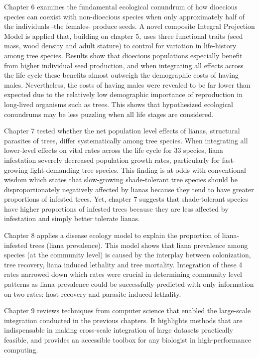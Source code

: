 \documentclass[b5paper,justified]{tufte-book} %
\begin{document}
\begin{fullwidth}
Chapter 6 examines the fundamental ecological conundrum of how dioecious species can coexist with non-dioecious species when only approximately half of the individuals -the females- produce seeds. A novel composite Integral Projection Model is applied that, building on chapter 5, uses three functional traits (seed mass, wood density and adult stature) to control for variation in life-history among tree species. Results show that dioecious populations especially benefit from higher individual seed production, and when integrating all effects across the life cycle these benefits almost outweigh the demographic costs of having males. Nevertheless, the costs of having males were revealed to be far lower than expected due to the relatively low demographic importance of reproduction in long-lived organisms such as trees. This shows that hypothesized ecological conundrums may be less puzzling when all life stages are considered. 

Chapter 7 tested whether the net population level effects of lianas, structural parasites of trees, differ systematically among tree species. When integrating all lower-level effects on vital rates across the life cycle for 33 species, liana infestation severely decreased population growth rates, particularly for fast-growing light-demanding tree species. This finding is at odds with conventional wisdom which states that slow-growing shade-tolerant tree species should be disproportionately negatively affected by lianas because they tend to have greater proportions of infested trees.  Yet, chapter 7 suggests that shade-tolerant species have higher proportions of infested trees because they are less affected by infestation and simply better tolerate lianas. 

Chapter 8 applies a disease ecology model to explain the proportion of liana-infested trees (liana prevalence). This model shows that liana prevalence among species (at the community level) is caused by the interplay between colonization, tree recovery, liana induced lethality and tree mortality. Integration of these 4 rates narrowed down which rates were crucial in determining community level patterns as liana prevalence could be successfully predicted with only information on two rates: host recovery and parasite induced lethality. 

Chapter 9 reviews techniques from computer science that enabled the large-scale integration conducted in the previous chapters. It highlights methods that are indispensable in making cross-scale integration of large datasets practically feasible, and provides an accessible toolbox for any biologist in high-performance computing.


\end{fullwidth}
\end{document}
